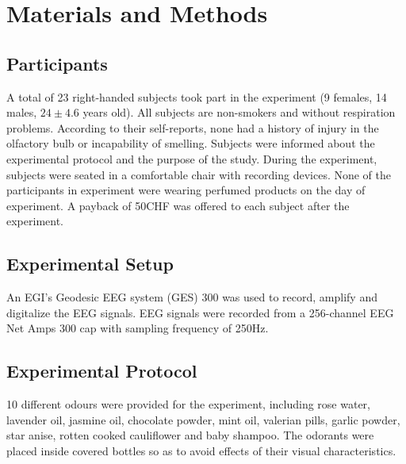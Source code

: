 \section{Materials and Methods}

\subsection{Participants}
A total of 23 right-handed subjects took part in the experiment (9 females, 14 males, $24 \pm 4.6$ years old). All subjects are non-smokers and without respiration problems. According to their self-reports, none had a history of injury in the olfactory bulb or incapability of smelling. Subjects were informed about the experimental protocol and the purpose of the study. During the experiment, subjects were seated in a comfortable chair with recording devices. None of the participants in experiment were wearing perfumed products on the day of experiment. A payback of 50CHF was offered to each subject after the experiment. 

\subsection{Experimental Setup}
An EGI's Geodesic EEG system (GES) 300 was used to record, amplify and digitalize the EEG signals. EEG signals were recorded from a 256-channel EEG Net Amps 300 cap with sampling frequency of 250Hz.  
\subsection{Experimental Protocol}
10 different odours were provided for the experiment, including rose water, lavender oil, jasmine oil, chocolate powder, mint oil, valerian pills, garlic powder, star anise, rotten cooked cauliflower and baby shampoo. The odorants were placed inside covered bottles so as to avoid effects of their visual characteristics.  

